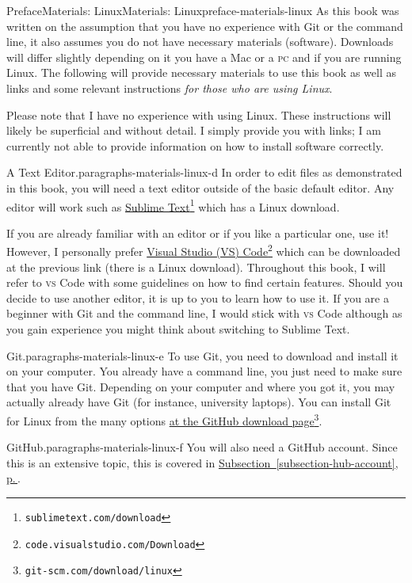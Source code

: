\documentclass[twoside,10pt,]{book}
\newcommand{\xreffont}{\relax}
\newcommand{\initialism}[1]{\textsc{\MakeLowercase{#1}}}
\begin{document}
\begin{preface}{Preface}{Materials: Linux}{}{Materials: Linux}{}{}{preface-materials-linux}
As this book was written on the assumption that you have no experience with Git or the command line, it also assumes you do not have necessary materials (software). Downloads will differ slightly depending on it you have a Mac or a \initialism{PC} and if you are running Linux. The following will provide necessary materials to use this book as well as links and some relevant instructions \emph{for those who are using Linux}.%
\par
Please note that I have no experience with using Linux. These instructions will likely be superficial and without detail. I simply provide you with links; I am currently not able to provide information on how to install software correctly.%
\begin{paragraphs}{A Text Editor.}{paragraphs-materials-linux-d}%
In order to edit files as demonstrated in this book, you will need a text editor outside of the basic default editor. Any editor will work such as \href{https://www.sublimetext.com/download}{Sublime Text}\footnote{\nolinkurl{sublimetext.com/download}\label{fn-materials-linux-d-b-b}} which has a Linux download.%
\par
If you are already familiar with an editor or if you like a particular one, use it! However, I personally prefer \href{https://code.visualstudio.com/Download}{Visual Studio (VS) Code}\footnote{\nolinkurl{code.visualstudio.com/Download}\label{fn-materials-linux-d-c-b}} which can be downloaded at the previous link (there is a Linux download). Throughout this book, I will refer to \initialism{VS} Code with some guidelines on how to find certain features. Should you decide to use another editor, it is up to you to learn how to use it. If you are a beginner with Git and the command line, I would stick with \initialism{VS} Code although as you gain experience you might think about switching to Sublime Text.%
\end{paragraphs}%
\begin{paragraphs}{Git.}{paragraphs-materials-linux-e}%
To use Git, you need to download and install it on your computer. You already have a command line, you just need to make sure that you have Git. Depending on your computer and where you got it, you may actually already have Git (for instance, university laptops). You can install Git for Linux from the many options \href{https://git-scm.com/download/linux}{at the GitHub download page}\footnote{\nolinkurl{git-scm.com/download/linux}\label{fn-materials-linux-e-b-b}}.%
\end{paragraphs}%
\begin{paragraphs}{GitHub.}{paragraphs-materials-linux-f}%
You will also need a GitHub account. Since this is an extensive topic, this is covered in \hyperref[subsection-hub-account]{Subsection~{\xreffont\ref{subsection-hub-account}}, p.\,\pageref{subsection-hub-account}}.%
\end{paragraphs}%
\end{preface}
\end{document}
